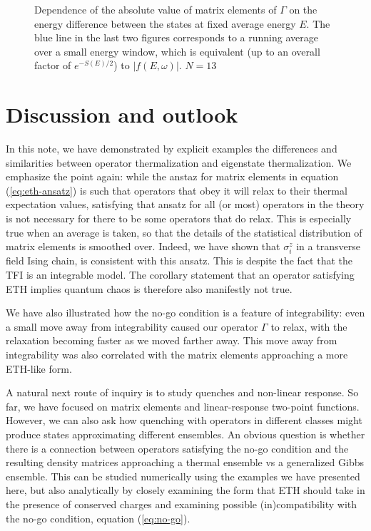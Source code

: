 \begin{figure}
\caption{Dependence of the absolute value of matrix elements of $\Gamma$ on the energy difference between the states at fixed average energy $E$. The blue line in the last two figures corresponds to a running average over a small energy window, which is equivalent (up to an overall factor of $e^{-S(E)/2}$) to $|f(E,\omega)|$. $N=13$}
\label{fig:wdep-gamma}
\end{figure}


\section{Discussion and outlook}
In this note, we have demonstrated by explicit examples the differences and similarities between operator thermalization and eigenstate thermalization. We emphasize the point again: while the anstaz for matrix elements in equation (\ref{eq:eth-ansatz}) is such that operators that obey it will relax to their thermal expectation values, satisfying that ansatz for all (or most) operators in the theory is not necessary for there to be some operators that do relax. This is especially true when an average is taken, so that the details of the statistical distribution of matrix elements is smoothed over. Indeed, we have shown that $\sigma^z_i$ in a transverse field Ising chain, is consistent with this ansatz. This is despite the fact that the TFI is an integrable model. The corollary statement that an operator satisfying ETH implies quantum chaos is therefore also manifestly not true. 

We have also illustrated how the no-go condition is a feature of integrability: even a small move away from integrability caused our operator $\Gamma$ to relax, with the relaxation becoming faster as we moved farther away. This move away from integrability was also correlated with the matrix elements approaching a more ETH-like form.

A natural next route of inquiry is to study quenches and non-linear response. So far, we have focused on matrix elements and linear-response two-point functions. However, we can also ask how quenching with operators in different classes might produce states approximating different ensembles. An obvious question is whether there is a connection between operators satisfying the no-go condition and the resulting density matrices approaching a thermal ensemble vs a generalized Gibbs ensemble. This can be studied numerically using the examples we have presented here, but also analytically by closely examining the form that ETH should take in the presence of conserved charges and examining possible (in)compatibility with the no-go condition, equation (\ref{eq:no-go}).

